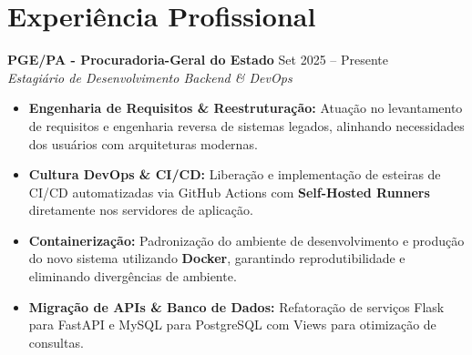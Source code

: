 \section*{Experiência Profissional}

\textbf{PGE/PA - Procuradoria-Geral do Estado} \hfill Set 2025 -- Presente \\
\textit{Estagiário de Desenvolvimento Backend \& DevOps}
\vspace{4pt}

\begin{itemize}[nosep, leftmargin=*]
    \item \textbf{Engenharia de Requisitos \& Reestruturação:} Atuação no levantamento de requisitos e engenharia reversa de sistemas legados, alinhando necessidades dos usuários com arquiteturas modernas.
    \item \textbf{Cultura DevOps \& CI/CD:} Liberação e implementação de esteiras de CI/CD automatizadas via GitHub Actions com \textbf{Self-Hosted Runners} diretamente nos servidores de aplicação.
    \item \textbf{Containerização:} Padronização do ambiente de desenvolvimento e produção do novo sistema utilizando \textbf{Docker}, garantindo reprodutibilidade e eliminando divergências de ambiente.
    \item \textbf{Migração de APIs \& Banco de Dados:} Refatoração de serviços Flask para FastAPI e MySQL para PostgreSQL com Views para otimização de consultas.
\end{itemize}